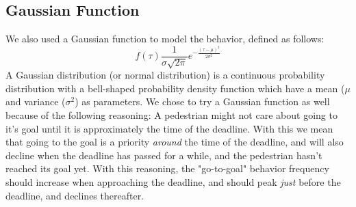 \documentclass[11pt]{book}
\begin{document}
\subsection{Gaussian Function}
We also used a Gaussian function to model the behavior, defined as follows:
\begin{equation}f(\tau)\frac{1}{\sigma \sqrt{2 \pi}} e^{- \frac{(\tau - \mu)^2}{2\sigma^2}}
\end{equation}
A Gaussian distribution (or normal distribution) is a continuous probability distribution with a bell-shaped probability density function which have a mean ($\mu$ and variance ($\sigma^2$) as parameters.
We chose to try a Gaussian function as well because of the following reasoning: A pedestrian might not care about going to it's goal until it is approximately the time of the deadline. With this we mean that going to the goal is a priority \emph{around} the time of the deadline, and will also decline when the deadline has passed for a while, and the pedestrian hasn't reached its goal yet. With this reasoning, the "go-to-goal" behavior frequency should increase when approaching the deadline, and should peak \emph{just} before the deadline, and declines thereafter.
\end{document}

